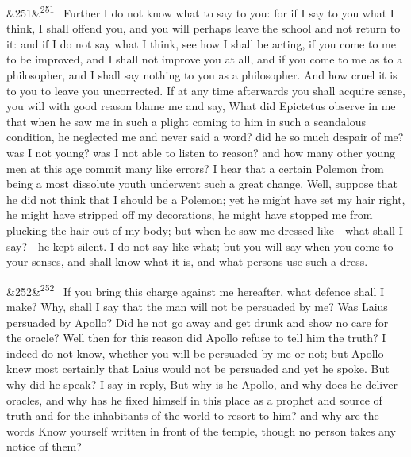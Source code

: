 \documentclass[12pt]{article}
\newcommand{\para}[1][]{\par\noindent\ifx&#1&\else\textsuperscript{\footnotesize #1}~\fi}
\begin{document}
\para[251] Further I do not know what to say to you: for if I say to you what I think, I shall offend you, and you will perhaps leave the school and not return to it: and if I do not say what I think, see how I shall be acting, if you come to me to be improved, and I shall not improve you at all, and if you come to me as to a philosopher, and I shall say nothing to you as a philosopher. And how cruel it is to you to leave you uncorrected. If at any time afterwards you shall acquire sense, you will with good reason blame me and say, What did Epictetus observe in me that when he saw me in such a plight coming to him in such a scandalous condition, he neglected me and never said a word? did he so much despair of me? was I not young? was I not able to listen to reason? and how many other young men at this age commit many like errors? I hear that a certain Polemon from being a most dissolute youth underwent such a great change. Well, suppose that he did not think that I should be a Polemon; yet he might have set my hair right, he might have stripped off my decorations, he might have stopped me from plucking the hair out of my body; but when he saw me dressed like—what shall I say?—he kept silent. I do not say like what; but you will say when you come to your senses, and shall know what it is, and what persons use such a dress.

\para[252] If you bring this charge against me hereafter, what defence shall I make? Why, shall I say that the man will not be persuaded by me? Was Laius persuaded by Apollo? Did he not go away and get drunk and show no care for the oracle? Well then for this reason did Apollo refuse to tell him the truth? I indeed do not know, whether you will be persuaded by me or not; but Apollo knew most certainly that Laius would not be persuaded and yet he spoke. But why did he speak? I say in reply, But why is he Apollo, and why does he deliver oracles, and why has he fixed himself in this place as a prophet and source of truth and for the inhabitants of the world to resort to him? and why are the words Know yourself written in front of the temple, though no person takes any notice of them?
\end{document}
